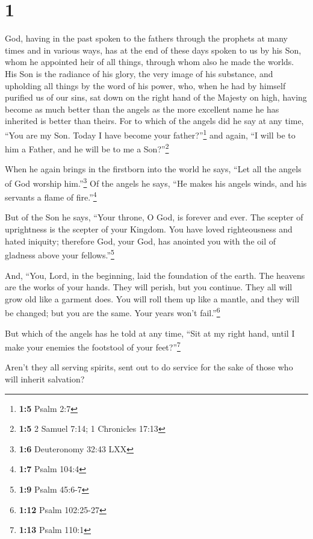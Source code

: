 \hypertarget{section}{%
\section{1}\label{section}}

 God, having in the past spoken to the fathers through the
prophets at many times and in various ways,  has at the
end of these days spoken to us by his Son, whom he appointed heir of all
things, through whom also he made the worlds.  His Son is
the radiance of his glory, the very image of his substance, and
upholding all things by the word of his power, who, when he had by
himself purified us of our sins, sat down on the right hand of the
Majesty on high,  having become as much better than the
angels as the more excellent name he has inherited is better than
theirs.  For to which of the angels did he say at any
time, ``You are my Son. Today I have become your father?''\footnote{\textbf{1:5}
  Psalm 2:7} and again, ``I will be to him a Father, and he will be to
me a Son?''\footnote{\textbf{1:5} 2 Samuel 7:14; 1 Chronicles 17:13}

 When he again brings in the firstborn into the world he
says, ``Let all the angels of God worship him.''\footnote{\textbf{1:6}
  Deuteronomy 32:43 LXX}  Of the angels he says, ``He
makes his angels winds, and his servants a flame of fire.''\footnote{\textbf{1:7}
  Psalm 104:4}

 But of the Son he says, ``Your throne, O God, is forever
and ever. The scepter of uprightness is the scepter of your Kingdom.
 You have loved righteousness and hated iniquity;
therefore God, your God, has anointed you with the oil of gladness above
your fellows.''\footnote{\textbf{1:9} Psalm 45:6-7}

 And, ``You, Lord, in the beginning, laid the foundation
of the earth. The heavens are the works of your hands. 
They will perish, but you continue. They all will grow old like a
garment does.  You will roll them up like a mantle, and
they will be changed; but you are the same. Your years won't
fail.''\footnote{\textbf{1:12} Psalm 102:25-27}

 But which of the angels has he told at any time, ``Sit
at my right hand, until I make your enemies the footstool of your
feet?''\footnote{\textbf{1:13} Psalm 110:1}

 Aren't they all serving spirits, sent out to do service
for the sake of those who will inherit salvation?

